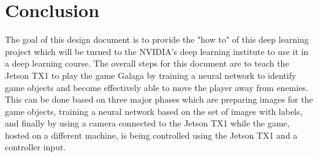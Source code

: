 \documentclass{onecolumn, draftclsnofoot,10pt, compsoc}[IEEEtran
\begin{document}
\section{Conclusion}
The goal of this design document is to provide the "how to" of this deep learning project which will be turned to the NVIDIA's deep learning institute to use it in a deep learning course.
The overall steps for this document are to teach the Jetson TX1 to play the game Galaga by training a neural network to identify game objects and become effectively able to move the player away from enemies.
This can be done based on three major phases which are preparing images for the game objects, training a neural network based on the set of images with labels, and finally by using a camera connected to the Jetson TX1 while the game, hosted on a different machine, is being controlled using the Jetson TX1 and a controller input.
\end{document}

